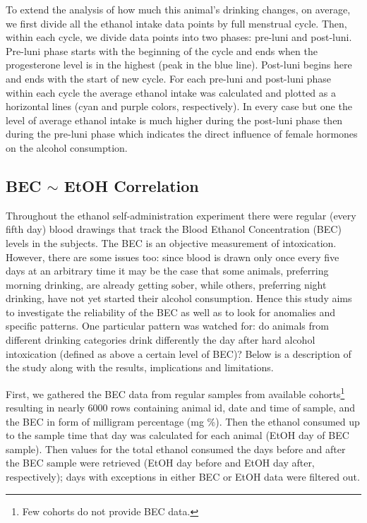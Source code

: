 	To extend the analysis of how much this animal's drinking changes, on average, we first divide all the ethanol intake data points by full menstrual cycle. Then, within each cycle, we divide data points into two phases: pre-luni and post-luni. Pre-luni phase starts with the beginning of the cycle and ends when the progesterone level is in the highest (peak in the blue line). Post-luni begins here and ends with the start of new cycle. For each pre-luni and post-luni phase within each cycle the average ethanol intake was calculated and plotted as a horizontal lines (cyan and purple colors, respectively). In every case but one the level of average ethanol intake is much higher during the post-luni phase then during the pre-luni phase which indicates the direct influence of female hormones on the alcohol consumption. 
	

	\subsection{BEC $\sim$ EtOH Correlation}	
	Throughout the ethanol self-administration experiment there were regular (every fifth day) blood drawings  that track the Blood Ethanol Concentration (BEC) levels in the subjects. The BEC is an objective measurement of intoxication. However, there are some issues too: since blood is drawn only once every five days at an arbitrary time it may be the case that some animals, preferring morning drinking, are already getting sober, while others, preferring night drinking, have not yet started their alcohol consumption. Hence this study aims to investigate the reliability of the BEC as well as to look for anomalies and specific patterns. One particular pattern was watched for: do animals from different drinking categories drink differently the day after hard alcohol intoxication (defined as above a certain level of BEC)? Below is a description of the study along with the results, implications and limitations. 
	
	First, we gathered the BEC data from regular samples from available cohorts\footnote{Few cohorts do not provide BEC data.} resulting in nearly 6000 rows containing animal id, date and time of sample, and the BEC in form of milligram percentage (mg \%). Then the ethanol consumed up to the sample time that day was calculated for each animal (EtOH day of BEC sample). Then values for the total ethanol consumed the days before and after the BEC sample were retrieved (EtOH day before and EtOH day after, respectively); days with exceptions in either BEC or EtOH data were filtered out.
	
